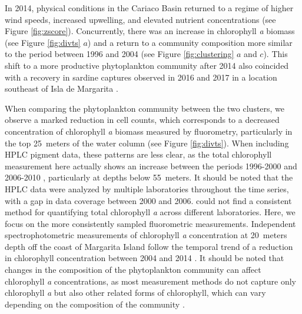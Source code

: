 In 2014, physical conditions in the Cariaco Basin returned to a regime of higher wind speeds, increased upwelling, and elevated nutrient concentrations (see Figure \ref{fig:zscore}). Concurrently, there was an increase in chlorophyll \textit{a} biomass (see Figure \ref{fig:divts} $a$) and a return to a community composition more similar to the period between 1996 and 2004 (see Figure \ref{fig:clustering} $a$ and $c$). This shift to a more productive phytoplankton community after 2014 also coincided with a recovery in sardine captures observed in 2016 and 2017 in a location southeast of Isla de Margarita \cite{gomez_gaspar_variacion_2025}.

When comparing the phytoplankton community between the two clusters, we observe a marked reduction in cell counts, which corresponds to a decreased concentration of chlorophyll \textit{a} biomass measured by fluorometry, particularly in the top \qty{25}{meters} of the water column (see Figure \ref{fig:divts}). When including HPLC pigment data, these patterns are less clear, as the total chlorophyll measurement here actually shows an increase between the periods 1996-2000 and 2006-2010 \cite{pinckney_phytoplankton_2015}, particularly at depths below \qty{55}{meters}. It should be noted that the HPLC data were analyzed by multiple laboratories throughout the time series, with a gap in data coverage between 2000 and 2006.  could not find a consistent method for quantifying total chlorophyll \textit{a} across different laboratories. Here, we focus on the more consistently sampled fluorometric measurements. Independent spectrophotometric measurements of chlorophyll \textit{a} concentration at \qty{20}{meters} depth off the coast of Margarita Island follow the temporal trend of a reduction in chlorophyll concentration between 2004 and 2014 \cite{gomez_gaspar_variacion_2025}. It should be noted that changes in the composition of the phytoplankton community can affect chlorophyll \textit{a} concentrations, as most measurement methods do not capture only chlorophyll \textit{a} but also other related forms of chlorophyll, which can vary depending on the composition of the community \cite{welschmeyer_fluorometric_1994}. 

